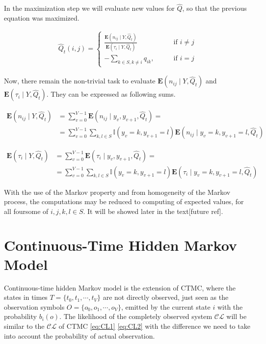 \documentclass[thesis=M,english]{FITthesis}[2012/10/20]
\begin{document}
In the maximization step we will evaluate new values for $\hat Q$, so that the previous equation was maximized. 

\begin{equation}
\begin{aligned}  
\hat Q_t(i,j)= 
\begin{cases}
\frac{ \mathbf{E}(n_{ij} \mid Y, \hat Q_t )}{ \mathbf{E}( \tau_i \mid Y, \hat Q_t ) } & \text{if } i\neq j\\
- \sum\limits_{k \in S ,k \neq i} q_{ik}, \qquad & \text{if } i=j
\end{cases}
\end{aligned}
\end{equation}

Now, there remain the non-trivial task to evaluate $\mathbf{E}( n_{ij} \mid Y, \hat Q_t )$ and $\mathbf{E}( \tau_i \mid Y, \hat Q_t )$. They can be expressed as following sums.


\begin{equation}
\begin{aligned}  
\mathbf{E}(n_{ij} \mid Y, \hat Q_t ) &= \sum_{v=0}^{V-1} \mathbf{E}(n_{ij} \mid y_v, y_{v+1}, \hat Q_t ) = \\
&= \sum_{v=0}^{V-1} \sum_{k,l \in S} \mathbb{I}( y_v = k, y_{v+1} = l ) \mathbf{E}(n_{ij} \mid y_v = k, y_{v+1} = l, \hat Q_t )
\end{aligned}
\end{equation}


\begin{equation}
\begin{aligned}  
\mathbf{E}( \tau_i \mid Y, \hat Q_t ) &= \sum_{v=0}^{V-1} \mathbf{E}(\tau_i \mid y_v, y_{v+1}, \hat Q_t ) = \\
&= \sum_{v=0}^{V-1} \sum_{k,l \in S} \mathbb{I}( y_v = k, y_{v+1} = l ) \mathbf{E}(\tau_i \mid y_v = k, y_{v+1} = l, \hat Q_t )
\end{aligned}
\end{equation}
   
With the use of the Markov property and from homogeneity of the Markov process, the computations may be reduced to computing of expected values, for all foursome of $i,j,k,l \in S$. It will be showed later in the text[future ref].     
   
\section{Continuous-Time Hidden Markov Model}

Continuous-time hidden Markov model is the extension of CTMC, where the states in times $T = \{ t_0, t_1, \cdots, t_{V} \}$ are not directly observed, just seen as the observation symbols $O = \{  o_0, o_1, \cdots, o_{V} \}$, emitted by the current state $i$ with the probability $b_i(o)$.
The likelihood of the completely observed system  $\mathcal{CL}$ will be similar to the $\mathcal{CL}$ of CTMC \eqref{eq:CL1} \eqref{eq:CL2} with the difference we need to take into account the probability of actual observation.
\end{document}
